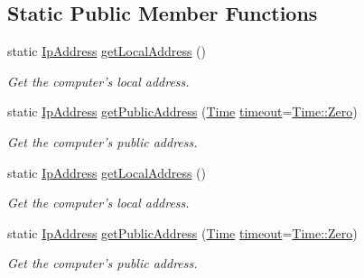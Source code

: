 \subsection*{Static Public Member Functions}
\begin{DoxyCompactItemize}
\item 
static \hyperlink{classsf_1_1_ip_address}{Ip\-Address} \hyperlink{classsf_1_1_ip_address_a4c31622ad87edca48adbb8e8ed00ee4a}{get\-Local\-Address} ()
\begin{DoxyCompactList}\small\item\em Get the computer's local address. \end{DoxyCompactList}\item 
static \hyperlink{classsf_1_1_ip_address}{Ip\-Address} \hyperlink{classsf_1_1_ip_address_a5c5cbf67e4aacf23c24f2ad991df4c55}{get\-Public\-Address} (\hyperlink{classsf_1_1_time}{Time} \hyperlink{_ndk_8cpp_a174cf046f3b5dbb1258515b3f138b8c7}{timeout}=\hyperlink{classsf_1_1_time_aa343e67f43a940e7b3b51aa10a495f2f}{Time\-::\-Zero})
\begin{DoxyCompactList}\small\item\em Get the computer's public address. \end{DoxyCompactList}\item 
static \hyperlink{classsf_1_1_ip_address}{Ip\-Address} \hyperlink{classsf_1_1_ip_address_a4c31622ad87edca48adbb8e8ed00ee4a}{get\-Local\-Address} ()
\begin{DoxyCompactList}\small\item\em Get the computer's local address. \end{DoxyCompactList}\item 
static \hyperlink{classsf_1_1_ip_address}{Ip\-Address} \hyperlink{classsf_1_1_ip_address_a5c5cbf67e4aacf23c24f2ad991df4c55}{get\-Public\-Address} (\hyperlink{classsf_1_1_time}{Time} \hyperlink{_ndk_8cpp_a174cf046f3b5dbb1258515b3f138b8c7}{timeout}=\hyperlink{classsf_1_1_time_aa343e67f43a940e7b3b51aa10a495f2f}{Time\-::\-Zero})
\begin{DoxyCompactList}\small\item\em Get the computer's public address. \end{DoxyCompactList}\end{DoxyCompactItemize}
